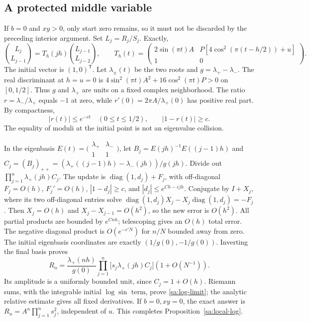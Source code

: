 \documentclass[11pt]{article}
\numberwithin{equation}{section}
\theoremstyle{definition}\newtheorem{definition}[theorem]{Definition}
\theoremstyle{remark}\newtheorem{remark}[theorem]{Remark}
\begin{document}
\subsection{A protected middle variable}
If $b=0$ and $xy>0$, only start zero remains, so it must not be
discarded by the preceding interior argument. Set $L_j=R_j/S_j$.
Exactly,
\[
 \binom{L_j}{L_{j-1}}=T_h(jh)\binom{L_{j-1}}{L_{j-2}},\qquad
 T_h(t)=\begin{pmatrix}2\sin(\pi t)A&P[4\cos^2(\pi(t-h/2))+u]\\1&0\end{pmatrix}.
\]
The initial vector is $(1,0)^{\mathsf T}$.
Let $\lambda_\pm(t)$ be the two roots and $g=\lambda_+-\lambda_-$.
The real discriminant at $h=u=0$ is
$4\sin^2(\pi t)A^2+16\cos^2(\pi t)P>0$ on $[0,1/2]$.
Thus $g$ and $\lambda_+$ are units on a fixed complex neighborhood.
The ratio $r=\lambda_-/\lambda_+$ equals $-1$ at zero, while
$r'(0)=2\pi A/\lambda_+(0)$ has positive real part. By compactness,
\[
 |r(t)|\le e^{-ct}\quad(0\le t\le1/2),\qquad |1-r(t)|\ge c.
\]
The equality of moduli at the initial point is not an eigenvalue
collision.

In the eigenbasis $E(t)=\bigl(\begin{smallmatrix}\lambda_+&\lambda_-\\1&1\end{smallmatrix}\bigr)$,
let $B_j=E(jh)^{-1}E((j-1)h)$ and
$C_j=(B_j)_{++}=(\lambda_+((j-1)h)-\lambda_-(jh))/g(jh)$.
Divide out $\prod_{j=1}^n\lambda_+(jh)C_j$. The update is
$\operatorname{diag}(1,d_j)+F_j$, with off-diagonal $F_j=O(h)$,
$F_j'=O(h)$, $|1-d_j|\ge c$, and
$|d_j|\le e^{Ch-cjh}$.
Conjugate by $I+X_j$, where its two off-diagonal entries solve
$\operatorname{diag}(1,d_j)X_j-X_j\operatorname{diag}(1,d_j)=-F_j$.
Then $X_j=O(h)$ and $X_j-X_{j-1}=O(h^2)$, so the new error is
$O(h^2)$. All partial products are bounded by $e^{Cnh}$; telescoping
gives an $O(h)$ total error. The negative diagonal product is
$O(e^{-c'N})$ for $n/N$ bounded away from zero.
The initial eigenbasis coordinates are exactly $(1/g(0),-1/g(0))$.
Inverting the final basis proves
\begin{equation}\label{sa:protected-packet}
 R_n=\frac{\lambda_+(nh)}{g(0)}
      \prod_{j=1}^n\bigl[s_j\lambda_+(jh)C_j\bigr](1+O(N^{-1})).
\end{equation}
Its amplitude is a uniformly bounded unit, since $C_j=1+O(h)$.
Riemann sums, with the integrable initial $\log\sin$ term, prove
\eqref{sa:log-limit}; the analytic relative estimate gives all fixed
derivatives. If $b=0,xy=0$, the exact answer is
$R_n=A^n\prod_{j=1}^ns_j^2$, independent of $u$.
This completes Proposition~\ref{sa:local-log}.
\end{document}
